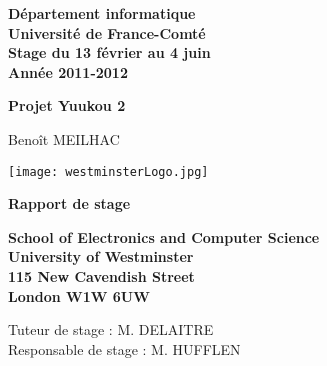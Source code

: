 \begin{titlepage}
    \centering

    \vspace{5mm}

	\normalsize{
		\textbf{
			D\'epartement informatique\\
			Universit\'e de France-Comt\'e\\
			Stage du 13 f\'evrier au 4 juin\\
			Ann\'ee 2011-2012
		}
	}

    \vspace{5mm}
	
    \Huge{
        \textbf{
            Projet Yuukou 2
        }
    }

    \vspace{5mm}

    \normalsize{
        Beno\^it MEILHAC
    }

    \vspace{5mm}
	
    \begin{center} 
        \texttt{[image: westminsterLogo.jpg]}
	\end{center}
	
    \vspace{14mm}

    \Huge{
        \textbf{
            Rapport de stage
        }
	}

	\vspace{20mm}

    \normalsize{
        \textbf{
			School of Electronics and Computer Science\\
            University of Westminster\\
        	115 New Cavendish Street\\
			London W1W 6UW\\
        }
    }

	\vspace{5mm}

	\normalsize{	
	    Tuteur de stage : M. DELAITRE\\
		Responsable de stage : M. HUFFLEN
	}

\end{titlepage}

\clearpage


